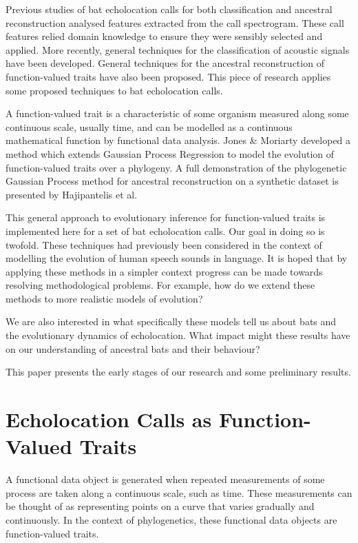 \documentclass[wsdraft]{ws-rv9x6} %
\begin{document}
Previous studies of bat echolocation calls for both classification \cite{walters2012continental} and ancestral reconstruction \cite{collen2012evolution} analysed features extracted from the call spectrogram. These call features relied domain knowledge to ensure they were sensibly selected and applied. More recently, general techniques for the classification of acoustic signals have been developed. \cite{stathopoulos2014bat} \cite{damoulas2010bayesian} General techniques for the ancestral reconstruction of function-valued traits have also been proposed. \cite{group2012phylogenetic} This piece of research applies some proposed techniques to bat echolocation calls.

A function-valued trait\cite{meyer2005up} is a characteristic of some organism measured along some continuous scale, usually time, and can be modelled as a continuous mathematical function by functional data analysis. \cite{ramsay2006functional} Jones \& Moriarty \cite{jones2013evolutionary} developed a method which extends Gaussian Process Regression \cite{rasmussen2006gaussian} to model the evolution of function-valued traits over a phylogeny. A full demonstration of the phylogenetic Gaussian Process method for ancestral reconstruction on a synthetic dataset is presented by Hajipantelis et al.\cite{hadjipantelis2013function}

This general approach to evolutionary inference for function-valued traits is implemented here for a set of bat echolocation calls. Our goal in doing so is twofold. These techniques had previously been considered in the context of modelling the evolution of human speech sounds in language. \cite{group2012phylogenetic} It is hoped that by applying these methods in a simpler context progress can be made towards resolving methodological problems. For example, how do we extend these methods to more realistic models of evolution?

We are also interested in what specifically these models tell us about bats and the evolutionary dynamics of echolocation. What impact might these results have on our understanding of ancestral bats and their behaviour?

This paper presents the early stages of our research and some preliminary results.

\section{Echolocation Calls as Function-Valued Traits}
A functional data object is generated when repeated measurements of some process are taken along a continuous scale, such as time. \cite{ramsay2006functional} 
These measurements can be thought of as representing points on a curve that varies gradually and continuously. In the context of phylogenetics, these functional data objects are function-valued traits. \cite{meyer2005up}
\end{document}
